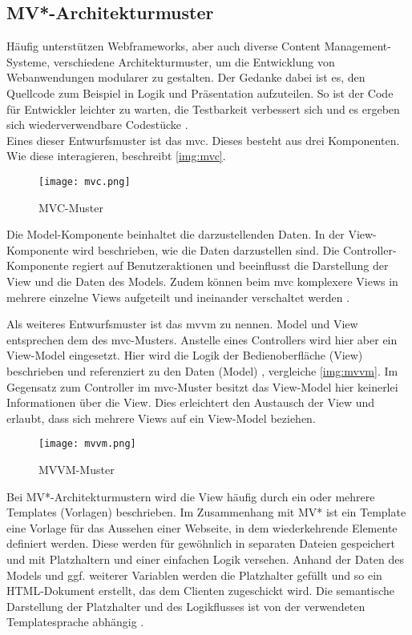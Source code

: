 \subsection{MV*-Architekturmuster}
Häufig unterstützen Webframeworks, aber auch diverse Content Management-Systeme, verschiedene Architekturmuster, um die Entwicklung von Webanwendungen modularer zu gestalten. Der Gedanke dabei ist es, den Quellcode zum Beispiel in Logik und Präsentation aufzuteilen. So ist der Code für Entwickler leichter zu warten, die Testbarkeit verbessert sich und es ergeben sich wiederverwendbare Codestücke \cite[S. 34]{ste15}. \\
Eines dieser Entwurfsmuster ist das \ac{mvc}. Dieses besteht aus drei Komponenten. Wie diese interagieren, beschreibt \autoref{img:mvc}.

\begin{figure}[H]
	\begin{center}
		\texttt{[image: mvc.png]}
		\caption{MVC-Muster}
		\label{img:mvc}
	\end{center}
\end{figure}

Die Model-Komponente beinhaltet die darzustellenden Daten. In der View-Komponente wird beschrieben, wie die Daten darzustellen sind. Die Controller-Komponente regiert auf Benutzeraktionen und beeinflusst die Darstellung der View und die Daten des Models. Zudem können beim \ac{mvc} komplexere Views in mehrere einzelne Views aufgeteilt und ineinander verschaltet werden \cite[S. 5 ff.]{gof}.

Als weiteres Entwurfsmuster ist das \ac{mvvm} zu nennen. Model und View entsprechen dem des \ac{mvc}-Musters. Anstelle eines Controllers wird hier aber ein View-Model eingesetzt. Hier wird die Logik der Bedienoberfläche (View) beschrieben und referenziert zu den Daten (Model) \cite[S. 40]{mvvm}, vergleiche \autoref{img:mvvm}. Im Gegensatz zum Controller im \ac{mvc}-Muster besitzt das View-Model hier keinerlei Informationen über die View. Dies erleichtert den Austausch der View und erlaubt, dass sich mehrere Views auf ein View-Model beziehen.

\begin{figure}[H]
	\begin{center}
		\texttt{[image: mvvm.png]}
		\caption{MVVM-Muster}
		\label{img:mvvm}
	\end{center}
\end{figure}

Bei MV*-Architekturmustern wird die View häufig durch ein oder mehrere Templates (Vorlagen) beschrieben. Im Zusammenhang mit MV* ist ein Template eine Vorlage für das Aussehen einer Webseite, in dem wiederkehrende Elemente definiert werden. Diese werden für gewöhnlich in separaten Dateien gespeichert und mit Platzhaltern und einer einfachen Logik versehen. Anhand der Daten des Models und ggf. weiterer Variablen werden die Platzhalter gefüllt und so ein HTML-Dokument erstellt, das dem Clienten zugeschickt wird. Die semantische Darstellung der Platzhalter und des Logikflusses ist von der verwendeten Templatesprache abhängig \cite[S. 37]{newman2008django}.